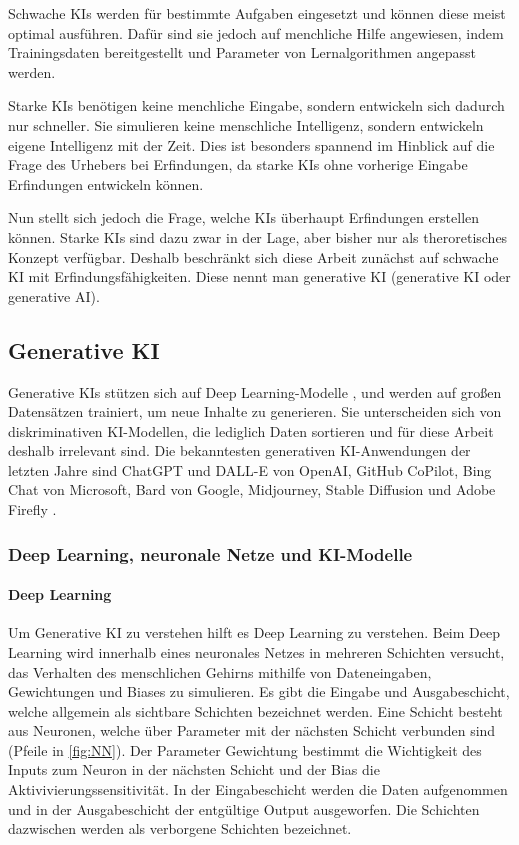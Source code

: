 Schwache KIs werden für bestimmte Aufgaben eingesetzt und 
können diese meist optimal ausführen. 
Dafür sind sie jedoch auf menchliche Hilfe angewiesen, 
indem Trainingsdaten bereitgestellt und 
Parameter von Lernalgorithmen angepasst werden.

Starke KIs benötigen keine menchliche Eingabe, 
sondern entwickeln sich dadurch nur schneller. 
Sie simulieren keine menschliche Intelligenz, 
sondern entwickeln eigene Intelligenz mit der Zeit. 
Dies ist besonders spannend im Hinblick auf die Frage 
des Urhebers bei Erfindungen, 
da starke KIs ohne vorherige Eingabe Erfindungen entwickeln können.
\cite{WasIstStarke2023}

Nun stellt sich jedoch die Frage,
welche KIs überhaupt 
Erfindungen erstellen können. Starke KIs sind dazu zwar in 
der Lage, aber bisher nur als theroretisches Konzept verfügbar. 
Deshalb beschränkt sich diese Arbeit zunächst auf schwache KI
mit Erfindungsfähigkeiten. Diese nennt man generative KI 
(generative KI oder generative AI).

\subsection{Generative KI}
Generative KIs
stützen sich auf Deep Learning-Modelle , 
und werden auf großen Datensätzen trainiert, um neue Inhalte zu generieren.  
Sie unterscheiden sich von diskriminativen KI-Modellen, 
die lediglich Daten sortieren und für diese Arbeit deshalb irrelevant sind. 
Die bekanntesten generativen KI-Anwendungen der letzten Jahre sind
ChatGPT und DALL-E von OpenAI, GitHub CoPilot, Bing Chat von Microsoft, 
Bard von Google, Midjourney, Stable Diffusion und Adobe Firefly \cite{WasIstGenerative}.

\subsubsection{Deep Learning, neuronale Netze und KI-Modelle}

\paragraph{Deep Learning}
Um Generative KI zu verstehen hilft es Deep Learning zu verstehen.
Beim Deep Learning wird innerhalb eines neuronales Netzes in
mehreren Schichten versucht, 
das Verhalten des menschlichen Gehirns mithilfe von Dateneingaben, 
Gewichtungen und Biases zu simulieren. 
Es gibt die Eingabe und Ausgabeschicht, 
welche allgemein als sichtbare Schichten bezeichnet werden.
Eine Schicht besteht aus Neuronen, welche über Parameter 
mit der nächsten Schicht verbunden sind (Pfeile in \ref{fig:NN}).
Der Parameter Gewichtung bestimmt die Wichtigkeit des Inputs 
zum Neuron in der nächsten Schicht und der Bias die Aktivivierungssensitivität.
In der Eingabeschicht werden die Daten aufgenommen und 
in der Ausgabeschicht der entgültige Output ausgeworfen.
Die Schichten dazwischen werden als verborgene Schichten bezeichnet.
\cite{WasIstDeep2023}
\cite{KuenstlicheIntelligenz}
\\
\\
